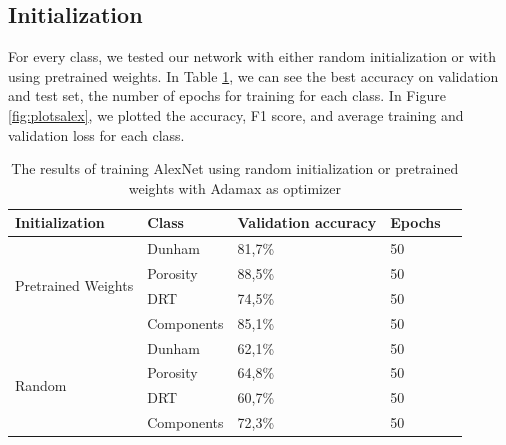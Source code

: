 \subsection{Initialization}
For every class, we tested our network with either random initialization or with using pretrained weights. In Table \ref{tab:alexinit}, we can see the best accuracy on validation and test set, the number of epochs for training for each class.  
In Figure \ref{fig:plotsalex}, we plotted the accuracy, F1 score, and average training and validation loss for each class. 
\begin{table}
\caption{\label{tab:alexinit} The results of training AlexNet using random initialization or pretrained weights with Adamax as optimizer}
\centering
\begin{tabular}[b]{| l | l | l | l | l |}
\hline
    Initialization & Class & Validation accuracy  & Epochs\\ \hline
    \multirow{4}{*}{Pretrained Weights} & Dunham &  81,7\%  & 50 \\ %
    & Porosity & 88,5\% &  50 \\
    &DRT & 74,5\% &  50 \\
    &Components & 85,1\% &  50 \\ \hline
     \multirow{4}{*}{Random} & Dunham &  62,1\% & 50 \\
    & Porosity & 64,8\% &  50 \\
    &DRT & 60,7\% &  50 \\
    &Components & 72,3\% & 50 \\ \hline
\end{tabular} 
\end{table}


